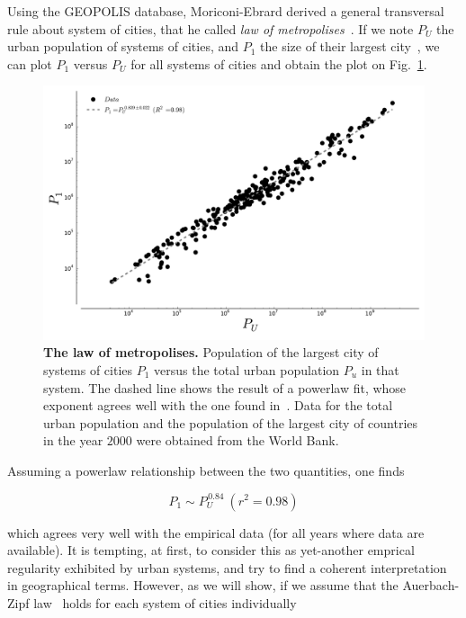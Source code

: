 Using the GEOPOLIS database, Moriconi-Ebrard derived a general transversal rule about system
of cities, that he called \emph{law of metropolises}~\cite{Pumain:1997}. If we
note $P_U$ the urban population of systems of cities, and $P_1$ the size of
their largest city~, we can
plot $P_1$ versus $P_U$ for all systems of cities and obtain the plot on
Fig.~\ref{fig:metropolises}.

\begin{figure}[!h]
    \centering
    \includegraphics[width=\textwidth]{gfx/chapter-intro/law_metropolises.pdf}
    \caption{{\bf The law of metropolises.} Population of the largest city of
    systems of cities $P_1$ versus the total urban population $P_u$ in that
system. The dashed line shows the result of a powerlaw fit, whose exponent
agrees well with the one found in~\cite{Pumain:1997}. Data for the total urban
population and the population of the largest city of countries in the year
$2000$ were obtained from
the World Bank.\label{fig:metropolises}}
\end{figure}

Assuming a powerlaw relationship between the two quantities, one finds

\begin{equation}
    P_1 \sim P_U^{\,0.84}\:(r^2=0.98)
    \label{eq:metropolis}
\end{equation}

which agrees very well with the empirical data (for all years where data are
available). It is tempting, at first, to consider this as yet-another emprical
regularity exhibited by urban systems, and try to find a coherent interpretation
in geographical terms. However, as we will show, if we assume that the Auerbach-Zipf
law~\cite{Auerbach:1913,Zipf:1949} holds for each system of cities
individually

